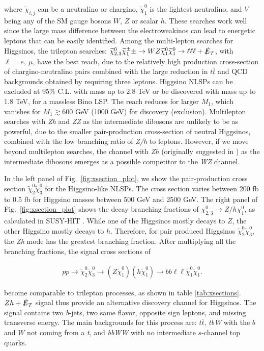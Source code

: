 \documentclass[a4paper,11pt]{article}
\newcommand{\N}{\widetilde{\chi}^0}
\newcommand{\C}{\widetilde{\chi}^\pm}
\newcommand{\met}{{\slashed{E}_T}}
\begin{document}
\noindent where $\widetilde{\chi}_{i,j}$ can be a neutralino or chargino, $\N_1$
is the lightest neutralino, and $V$ being any of the SM gauge bosons $W$, $Z$
or scalar $h$.  These searches work well since the large mass difference
between the electroweakinos can lead to energetic leptons that can be easily
identified. Among the multi-lepton searches for Higgsinos, the trilepton
searches: $\N_{2,3}\C_1\pm\rightarrow WZ\N_1\N_1\rightarrow \ell\ell\ell +
\met$, with $\ell=e, \ \mu$,  have the best reach, due to the relatively high
production cross-section of chargino-neutralino pairs combined with the large
reduction in $t\overline{t}$ and QCD backgrounds obtained by requiring three
leptons.  Higgsino NLSPs can be excluded at 95\% C.L. with mass up to 2.8 TeV
or be discovered with  mass up to 1.8 TeV, for a massless Bino LSP.   The reach
reduces for larger $M_1$, which vanishes for $M_1\gtrsim 600$ GeV (1000 GeV)
for discovery (exclusion).    Multilepton searches with \emph{Zh} and \emph{ZZ}
as the intermediate dibosons are unlikely to be as powerful, due to the smaller
pair-production cross-section of neutral Higgsinos, combined with the low
branching ratio of \emph{Z/h} to leptons. However, if we move beyond
multilepton searches, the channel with \emph{Zh} (originally suggested in
\cite{Han:2013kza}) as the intermediate dibosons emerges as a possible
competitor to the \emph{WZ} channel.  


In the left panel of Fig.~\ref{fig:xsection_plot}, we show the pair-production
cross section $\N_2\N_3$ for the Higgsino-like NLSPs.  The cross section varies
between 200 fb to 0.5 fb for Higgsino masses between 500 GeV and 2500 GeV. The
right panel of Fig.~\ref{fig:xsection_plot} shows the decay branching fractions
of $\chi_{2,3}^0\rightarrow Z/h \chi_1^0$, as calculated in SUSY-HIT
\cite{Djouadi:2006bz}.  While one of the Higgsinos mostly decays to $Z$, the
other Higgsino mostly decays to $h$.    Therefore,  for pair produced Higgsinos
$\N_2\N_3$, the \emph{Zh} mode has the greatest branching fraction.  After
multiplying all the branching fractions, the signal cross sections of 

\begin{align}
  pp\rightarrow \N_2\N_3\rightarrow (Z\N_1)(h\N_1)\rightarrow bb\ell\ell \N_1\N_1.
\end{align}

\noindent become comparable  to trilepton processes, as shown in table
\ref{tab:xsections}. $Zh+\met$ signal thus provide an alternative discovery
channel for Higgsinos. The signal contains two \emph{b}-jets, two same flavor,
opposite sign leptons, and missing transverse energy. The main backgrounds for
this process are: $t\overline{t}$, \emph{tbW} with the $b$ and $W$ not coming
from a \emph{t}, and \emph{bbWW} with no intermediate $s$-channel top quarks.  
\end{document}
